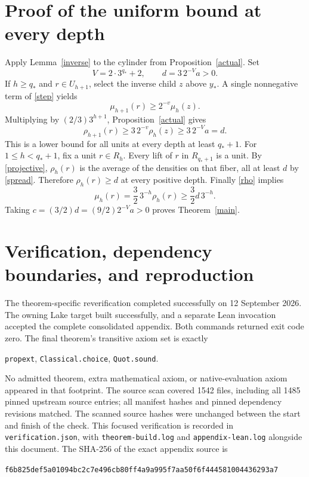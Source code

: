 \documentclass[11pt,a4paper]{article}
\theoremstyle{definition}\newtheorem{definition}[theorem]{Definition}
\theoremstyle{remark}\newtheorem{remark}[theorem]{Remark}
\newcommand{\code}[1]{{\small\nolinkurl{#1}}}
\begin{document}
\section{Proof of the uniform bound at every depth}
Apply Lemma~\ref{inverse} to the cylinder from Proposition~\ref{actual}.
Set
\[
 V=2\cdot3^{q_*}+2,\qquad d=3\,2^{-V}a>0.
\]
If $h\ge q_*$ and $r\in U_{h+1}$, select the inverse child $z$ above
$y_*$. A single nonnegative term of \eqref{step} yields
\[
 \mu_{h+1}(r)\ge2^{-v}\mu_h(z).
\]
Multiplying by $(2/3)3^{h+1}$, Proposition~\ref{actual} gives
\begin{equation}\label{spread}
 \rho_{h+1}(r)\ge3\,2^{-v}\rho_h(z)\ge3\,2^{-V}a=d.
\end{equation}
This is a lower bound for all units at every depth at least $q_*+1$.
For $1\le h<q_*+1$, fix a unit $r\in R_h$. Every lift of $r$ in
$R_{q_*+1}$ is a unit. By \eqref{projective}, $\rho_h(r)$ is the average
of the densities on that fiber, all at least $d$ by \eqref{spread}.
Therefore $\rho_h(r)\ge d$ at every positive depth.
Finally \eqref{rho} implies
\[
 \mu_h(r)=\frac32\,3^{-h}\rho_h(r)\ge\frac32d\,3^{-h}.
\]
Taking $c=(3/2)d=(9/2)2^{-V}a>0$ proves Theorem~\ref{main}.

\section{Verification, dependency boundaries, and reproduction}
The theorem-specific reverification completed successfully on 12 September
2026. The owning Lake target built successfully, and a separate Lean invocation
accepted the complete consolidated appendix. Both commands returned exit code
zero. The final theorem's transitive axiom set is exactly
\begin{center}\code{propext}, \code{Classical.choice}, \code{Quot.sound}.\end{center}
No admitted theorem, extra mathematical axiom, or native-evaluation axiom
appeared in that footprint. The source scan covered 1542 files,
including all 1485 pinned upstream source entries;
all manifest hashes and pinned dependency revisions matched. The scanned
source hashes were unchanged between the start and finish of the check.
This focused verification is recorded in \code{verification.json}, with
\code{theorem-build.log} and \code{appendix-lean.log} alongside this document.
The SHA-256 of the exact appendix source is
\begin{center}\footnotesize\texttt{f6b825def5a01094bc2c7e496cb80ff4a9a995f7aa50f6f444581004436293a7}\end{center}
\end{document}
